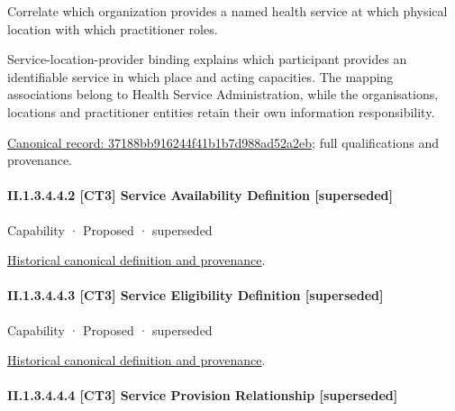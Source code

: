 Correlate which organization provides a named health service at which physical location with which practitioner roles.



Service-location-provider binding explains which participant provides an identifiable service in which place and acting capacities. The mapping associations belong to Health Service Administration, while the organisations, locations and practitioner entities retain their own information responsibility.


{\footnotesize \href{../../../../../../../continuum/strategy/capability/feature/37188bb916244f41b1b7d988ad52a2eb.md}{Canonical record: 37188bb916244f41b1b7d988ad52a2eb}; full qualifications and provenance.}\par
\paragraph*{II.1.3.4.4.2 [CT3] Service Availability Definition [superseded]}
\label{navigation:II.1.3.4.4.2}

\label{element:9e5329a42f964199b4b0a87ab1cacc2e}
{\small Capability · Proposed · superseded}\par
\href{../../../../../../../continuum/strategy/capability/9e5329a42f964199b4b0a87ab1cacc2e.md}{Historical canonical definition and provenance}.\par
\paragraph*{II.1.3.4.4.3 [CT3] Service Eligibility Definition [superseded]}
\label{navigation:II.1.3.4.4.3}

\label{element:8a3f29e5948141e2a3d0c72539759daf}
{\small Capability · Proposed · superseded}\par
\href{../../../../../../../continuum/strategy/capability/8a3f29e5948141e2a3d0c72539759daf.md}{Historical canonical definition and provenance}.\par
\paragraph*{II.1.3.4.4.4 [CT3] Service Provision Relationship [superseded]}
\label{navigation:II.1.3.4.4.4}

